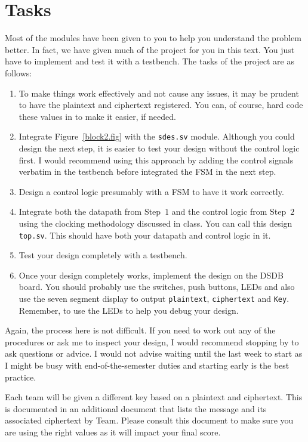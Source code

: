 \documentclass{article}
\begin{document}
\section{Tasks}

Most of the modules have been given to you to help you understand the
problem better.   In fact, we have given much of the project for you
in this text.  You just have to implement and test it with a
testbench.  The tasks of the project are as follows:
\begin{enumerate}
  \item To make things work effectively and not cause any issues, it
    may be prudent to have the    
    plaintext and ciphertext registered.  You
    can, of course, hard code these values in to make it easier, if needed.
\item  Integrate Figure~\ref{block2.fig} with the \verb!sdes.sv!
  module.  Although you could design the next step, it is easier to
  test your design without the control logic first.  I would recommend
  using this approach by adding the control signals verbatim in the
  testbench before integrated the FSM in the next step.
\item Design a control logic presumably with a FSM to have it work
  correctly.
  \item Integrate both the datapath from Step~$1$ and the control
    logic from Step~$2$ using the clocking methodology discussed in
    class.
    You can call this design \verb!top.sv!.  This should have both your datapath
    and control logic in it.
  \item Test  your design completely with a testbench.  
  \item Once your design completely works, implement the design on
    the DSDB board.  You should probably use the switches, push
    buttons, LEDs and also use the
    seven segment display to output \verb!plaintext!, \verb!ciphertext!
    and \verb!Key!.  Remember, to use the LEDs to help you
    debug your design.      
\end{enumerate}

Again, the process here is not difficult.  If you need to work out any
of the procedures or ask me to inspect your design, I would recommend
stopping by to ask questions or advice.  I would not advise waiting
until the last week to start as I might be busy with
end-of-the-semester duties and starting early is the best practice.

Each team will be given a different key based on a plaintext and
ciphertext.  This is documented in an additional document that lists
the message and its associated ciphertext by Team.  Please consult
this document to make sure you are using the right values as it will
impact your final score.
\end{document}
